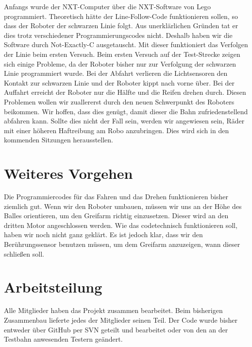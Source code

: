 \documentclass[11pt,a4paper]{article}
\begin{document}
Anfangs wurde der NXT-Computer über die NXT-Software von Lego programmiert. Theoretisch hätte der Line-Follow-Code funktionieren sollen, 
so dass der Roboter der schwarzen Linie folgt. Aus unerklärlichen Gründen tat er dies trotz verschiedener Programmierungscodes nicht. 
Deshalb haben wir die Software durch Not-Exactly-C ausgetauscht. Mit dieser funktioniert das Verfolgen der Linie beim ersten Versuch. 
Beim ersten Versuch auf der Test-Strecke zeigen sich einige Probleme, da der Roboter bisher nur zur Verfolgung der schwarzen Linie 
programmiert wurde. Bei der Abfahrt verlieren die Lichtsensoren den Kontakt zur schwarzen Linie und der Roboter kippt nach vorne über. 
Bei der Auffahrt erreicht der Roboter nur die Hälfte und die Reifen drehen durch. 
Diesen Problemen wollen wir zuallererst durch den neuen Schwerpunkt des Roboters beikommen. Wir hoffen, dass dies genügt, damit dieser
die Bahn zufriedenstellend abfahren kann. Sollte dies nicht der Fall sein, werden wir angewiesen sein, Räder mit einer höheren Haftreibung
am Robo anzubringen. Dies wird sich in den kommenden Sitzungen herausstellen.  

\section{Weiteres Vorgehen}

Die Programmiercodes für das Fahren und das Drehen funktionieren bisher ziemlich gut. Wenn wir den Roboter umbauen, müssen wir uns 
an der Höhe des Balles orientieren, um den Greifarm richtig einzusetzen. Dieser wird an den dritten Motor angeschlossen werden. 
Wie das codetechnisch funktionieren soll, haben wir noch nicht ganz geklärt. Es ist jedoch klar, dass wir den Berührungssensor 
benutzen müssen, um dem Greifarm anzuzeigen, wann dieser schließen soll. 


\section{Arbeitsteilung}

Alle Mitglieder haben das Projekt zusammen bearbeitet. Beim bisherigen Zusammenbau lieferte jedes der Mitglieder seinen Teil. 
Der Code wurde bisher entweder über GitHub per SVN geteilt und bearbeitet oder von den an der Testbahn anwesenden Testern 
geändert.
\end{document}
